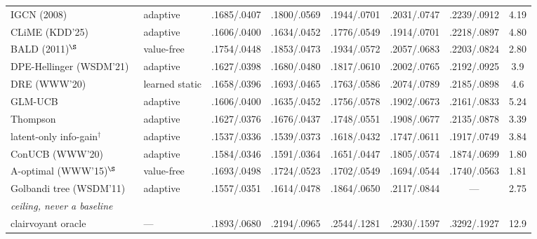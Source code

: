 \documentclass[runningheads]{llncs}
\begin{document}
\begin{table}[tbp]
{\begin{tabular}{llccccc c}
IGCN (2008)~\cite{rashid2008learning} & adaptive & .1685/.0407 & .1800/.0569 & .1944/.0701 & .2031/.0747 & .2239/.0912 & 4.19 \\
CLiME (KDD'25)~\cite{liu2025clisk} & adaptive & .1606/.0400 & .1634/.0452 & .1776/.0549 & .1914/.0701 & .2218/.0897 & 4.80 \\
BALD (2011)$^\S$~\cite{houlsby2011bald} & value-free & .1754/.0448 & .1853/.0473 & .1934/.0572 & .2057/.0683 & .2203/.0824 & 2.80 \\
DPE-Hellinger (WSDM'21)~\cite{parapar2021dpe} & adaptive & .1627/.0398 & .1680/.0480 & .1817/.0610 & .2002/.0765 & .2192/.0925 & 3.9 \\
DRE (WWW'20)~\cite{kweon2020deep} & learned static & .1658/.0396 & .1693/.0465 & .1763/.0586 & .2074/.0789 & .2185/.0898 & 4.6 \\
GLM-UCB~\cite{zhao2013interactive} & adaptive & .1606/.0400 & .1635/.0452 & .1756/.0578 & .1902/.0673 & .2161/.0833 & 5.24 \\
Thompson~\cite{zhao2013interactive} & adaptive & .1627/.0376 & .1676/.0437 & .1748/.0551 & .1908/.0677 & .2135/.0878 & 3.39 \\
latent-only info-gain$^\dagger$~\cite{ma2019eddi} & adaptive & .1537/.0336 & .1539/.0373 & .1618/.0432 & .1747/.0611 & .1917/.0749 & 3.84 \\
ConUCB (WWW'20)~\cite{zhang2020conucb} & adaptive & .1584/.0346 & .1591/.0364 & .1651/.0447 & .1805/.0574 & .1874/.0699 & 1.80 \\
A-optimal (WWW'15)$^\S$~\cite{anava2015budget,sepliarskaia2018spq} & value-free & .1693/.0498 & .1724/.0523 & .1702/.0549 & .1694/.0544 & .1740/.0563 & 1.81 \\
Golbandi tree (WSDM'11)~\cite{golbandi2011adaptive} & adaptive & .1557/.0351 & .1614/.0478 & .1864/.0650 & .2117/.0844 & --- & 2.75 \\
\midrule
\multicolumn{8}{l}{\emph{ceiling, never a baseline}}\\
clairvoyant oracle & --- & .1893/.0680 & .2194/.0965 & .2544/.1281 & .2930/.1597 & .3292/.1927 & 12.9 \\
\bottomrule
\end{tabular}}
\end{table}
\end{document}
